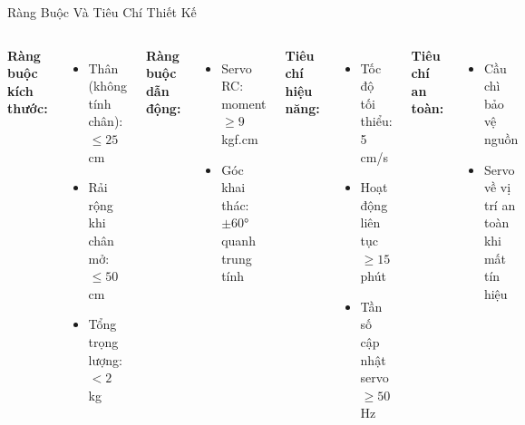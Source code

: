 \begin{frame}{Ràng Buộc Và Tiêu Chí Thiết Kế}
  \begin{columns}[T]
      \textbf{Ràng buộc kích thước:}
      \begin{itemize}
        \item Thân (không tính chân): $\leq 25$ cm
        \item Rải rộng khi chân mở: $\leq 50$ cm
        \item Tổng trọng lượng: $< 2$ kg
      \end{itemize}
      \vspace{0.2cm}
      \textbf{Ràng buộc dẫn động:}
      \begin{itemize}
        \item Servo RC: moment $\geq 9$ kgf.cm
        \item Góc khai thác: $\pm 60°$ quanh trung tính
      \end{itemize}
      \textbf{Tiêu chí hiệu năng:}
      \begin{itemize}
        \item Tốc độ tối thiểu: 5 cm/s
        \item Hoạt động liên tục $\geq 15$ phút
        \item Tần số cập nhật servo $\geq 50$ Hz
      \end{itemize}
      \vspace{0.2cm}
      \textbf{Tiêu chí an toàn:}
      \begin{itemize}
        \item Cầu chì bảo vệ nguồn
        \item Servo về vị trí an toàn khi mất tín hiệu
      \end{itemize}
  \end{columns}
\end{frame}
